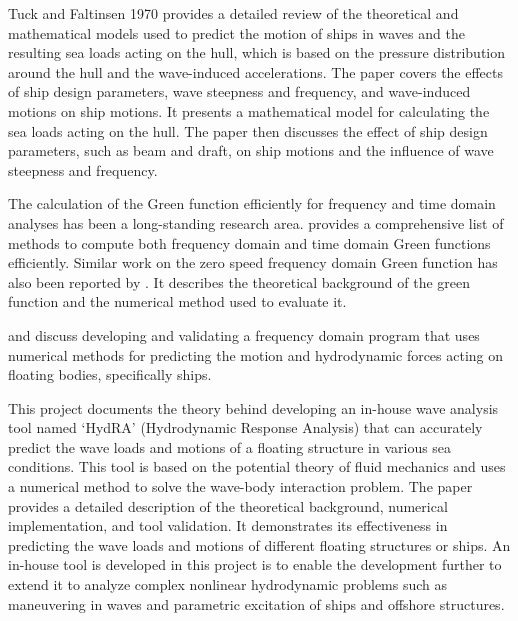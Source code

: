 Tuck and Faltinsen 1970 \cite{salvesen1970ship} provides a detailed review of the theoretical and mathematical models used to predict the motion of ships in waves and the resulting sea loads acting on the hull, which is based on the pressure distribution around the hull and the wave-induced accelerations. The paper covers the effects of ship design parameters, wave steepness and frequency, and wave-induced motions on ship motions. It presents a mathematical model for calculating the sea loads acting on the hull. The paper then discusses the effect of ship design parameters, such as beam and draft, on ship motions and the influence of wave steepness and frequency.

The calculation of the Green function efficiently for frequency and time domain analyses has been a long-standing research area. \cite{newman1979theory} provides a comprehensive list of methods to compute both frequency domain and time domain Green functions efficiently. Similar work on the zero speed frequency domain Green function has also been reported by \cite{telste1986numerical}. It describes the theoretical background of the green function and the numerical method used to evaluate it.

\cite{guha2013development} and \cite{guha2015estimation} discuss developing and validating a frequency domain program that uses numerical methods for predicting the motion and hydrodynamic forces acting on floating bodies, specifically ships.


This project documents the theory behind developing an in-house wave analysis tool named `HydRA' (Hydrodynamic Response Analysis) that can accurately predict the wave loads and motions of a floating structure in various sea conditions. This tool is based on the potential theory of fluid mechanics and uses a numerical method to solve the wave-body interaction problem. The paper provides a detailed description of the theoretical background, numerical implementation, and tool validation. It demonstrates its effectiveness in predicting the wave loads and motions of different floating structures or ships. An in-house tool is developed in this project is to enable the development further to extend it to analyze complex nonlinear hydrodynamic problems such as maneuvering in waves and parametric excitation of ships and offshore structures. 
